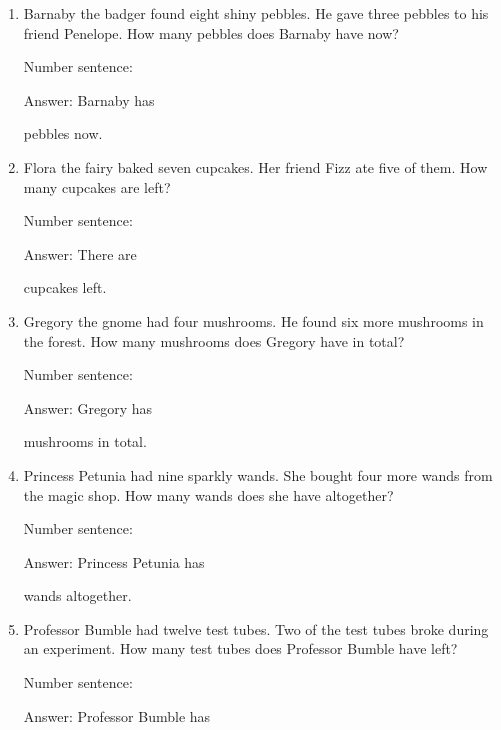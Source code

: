 \documentclass{tufte-book}
\begin{document}
\begin{enumerate}

\item
  Barnaby the badger found eight shiny pebbles. He gave three pebbles to
  his friend Penelope. How many pebbles does Barnaby have now?\medskip\par
  Number sentence:
  \dotfill\medskip\par
  Answer: Barnaby has
  \dotfill\medskip\par\mbox{}\dotfill\medskip\par\mbox{}\dotfill\bigskip
  pebbles now.
\item
  Flora the fairy baked seven cupcakes. Her friend Fizz ate five of
  them. How many cupcakes are left?\medskip\par
  Number sentence:
  \dotfill\medskip\par
  Answer: There are
  \dotfill\medskip\par\mbox{}\dotfill\medskip\par\mbox{}\dotfill\bigskip
  cupcakes left.
\item
  Gregory the gnome had four mushrooms. He found six more mushrooms in
  the forest. How many mushrooms does Gregory have in total?\medskip\par
  Number sentence:
  \dotfill\medskip\par
  Answer: Gregory has
  \dotfill\medskip\par\mbox{}\dotfill\medskip\par\mbox{}\dotfill\bigskip
  mushrooms in total.
\item
  Princess Petunia had nine sparkly wands. She bought four more wands
  from the magic shop. How many wands does she have altogether?\medskip\par
  Number sentence:
  \dotfill\medskip\par
  Answer: Princess Petunia has
  \dotfill\medskip\par\mbox{}\dotfill\medskip\par\mbox{}\dotfill\bigskip
  wands altogether.
\item
  Professor Bumble had twelve test tubes. Two of the test tubes broke
  during an experiment. How many test tubes does Professor Bumble have
  left?\medskip\par
  Number sentence:
  \dotfill\medskip\par
  Answer: Professor Bumble has
  \dotfill\medskip\par\mbox{}\dotfill\medskip\par\mbox{}\dotfill\bigskip

\end{enumerate}
\end{document}

